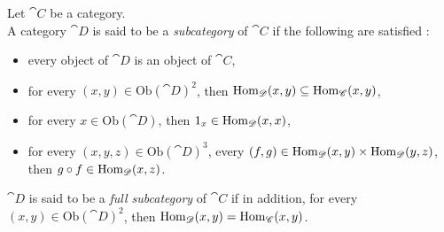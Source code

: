 \begin{mydef}
Let $\cat{C}$ be a category.\\
A category $\cat{D}$ is said to be a \textit{subcategory} of $\cat{C}$ if the following are satisfied :
\begin{itemize}
\item[1.] every object of $\cat{D}$ is an object of $\cat{C}$,
\item[2.] for every $(x,y)\in \text{Ob}(\cat{D})^2$, then $\text{Hom}_{\mathscr{D}}(x,y) \subseteq \text{Hom}_{\mathscr{C}}(x,y)$,
\item[3.] for every $x\in\text{Ob}(\cat{D})$, then $1_x \in \text{Hom}_{\mathscr{D}}(x,x)$,
\item[4.] for every $(x,y,z)\in\text{Ob}(\cat{D})^3$, every $(f,g)\in\text{Hom}_{\mathscr{D}}(x,y)\times \text{Hom}_{\mathscr{D}}(y,z)$, then $g\circ f \in \text{Hom}_{\mathscr{D}}(x,z)$.
\end{itemize}
$\cat{D}$ is said to be a \textit{full subcategory} of $\cat{C}$ if in addition, for every $(x,y)\in \text{Ob}(\cat{D})^2$, then $\text{Hom}_{\mathscr{D}}(x,y) = \text{Hom}_{\mathscr{C}}(x,y)$.
\end{mydef}



